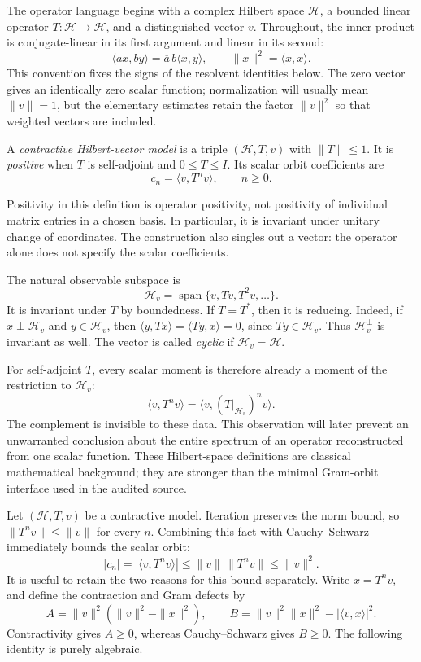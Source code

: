 \label{hilb:triples}
The operator language begins with a complex Hilbert space $\mathcal H$,
a bounded linear operator $T\colon\mathcal H\to\mathcal H$, and a
distinguished vector $v$. Throughout, the inner product is
conjugate-linear in its first argument and linear in its second:
\[
 \langle ax,by\rangle=\overline a\,b\langle x,y\rangle,
 \qquad \|x\|^2=\langle x,x\rangle.
\]
This convention fixes the signs of the resolvent identities below. The
zero vector gives an identically zero scalar function; normalization
will usually mean $\|v\|=1$, but the elementary estimates retain the
factor $\|v\|^2$ so that weighted vectors are included.

\begin{definition}
A \emph{contractive Hilbert-vector model} is a triple
$(\mathcal H,T,v)$ with $\|T\|\le1$. It is \emph{positive} when $T$ is
self-adjoint and $0\le T\le I$. Its scalar orbit coefficients are
\[
 c_n=\langle v,T^nv\rangle,\qquad n\ge0.
\]
\end{definition}
Positivity in this definition is operator positivity, not positivity
of individual matrix entries in a chosen basis. In particular, it is
invariant under unitary change of coordinates. The construction also
singles out a vector: the operator alone does not specify the scalar
coefficients.

The natural observable subspace is
\[
 \mathcal H_v=\overline{\operatorname{span}}
       \{v,Tv,T^2v,\ldots\}.
\]
It is invariant under $T$ by boundedness. If $T=T^*$, then it is reducing.
Indeed, if $x\perp\mathcal H_v$ and $y\in\mathcal H_v$, then
$\langle y,Tx\rangle=\langle Ty,x\rangle=0$, since
$Ty\in\mathcal H_v$. Thus $\mathcal H_v^\perp$ is invariant as well.
The vector is called \emph{cyclic} if $\mathcal H_v=\mathcal H$.

For self-adjoint $T$, every scalar moment is therefore already a
moment of the restriction to $\mathcal H_v$:
\[
 \langle v,T^nv\rangle
 =\langle v,(T|_{\mathcal H_v})^nv\rangle.
\]
The complement is invisible to these data. This observation will later
prevent an unwarranted conclusion about the entire spectrum of an
operator reconstructed from one scalar function. These Hilbert-space
definitions are classical mathematical background; they are stronger
than the minimal Gram-orbit interface used in the audited source.

\label{hilb:defects}
Let $(\mathcal H,T,v)$ be a contractive model. Iteration preserves the
norm bound, so $\|T^nv\|\le\|v\|$ for every $n$. Combining this fact
with Cauchy--Schwarz immediately bounds the scalar orbit:
\[
 |c_n|=|\langle v,T^nv\rangle|
       \le\|v\|\,\|T^nv\|\le\|v\|^2.
\]
It is useful to retain the two reasons for this bound separately.
Write $x=T^nv$, and define the contraction and Gram defects by
\[
 A=\|v\|^2(\|v\|^2-\|x\|^2),\qquad
 B=\|v\|^2\|x\|^2-|\langle v,x\rangle|^2.
\]
Contractivity gives $A\ge0$, whereas Cauchy--Schwarz gives $B\ge0$.
The following identity is purely algebraic.

